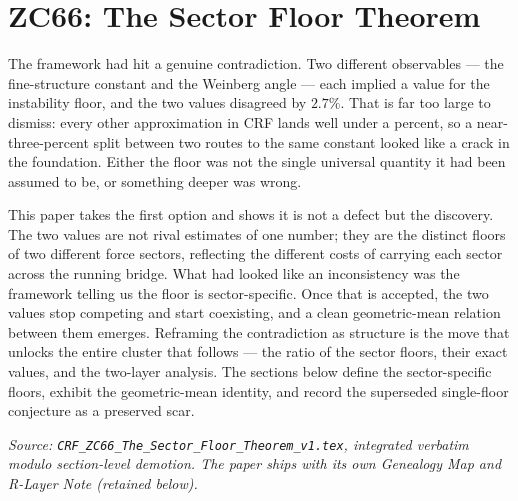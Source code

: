 \documentclass[12pt, a4paper]{article}
\begin{document}
\bigskip

\section{ZC66: The Sector Floor Theorem}

The framework had hit a genuine contradiction. Two different observables ---
the fine-structure constant and the Weinberg angle --- each implied a value for
the instability floor, and the two values disagreed by $2.7\%$. That is far too
large to dismiss: every other approximation in CRF lands well under a percent, so
a near-three-percent split between two routes to the same constant looked like a
crack in the foundation. Either the floor was not the single universal quantity
it had been assumed to be, or something deeper was wrong.

This paper takes the first option and shows it is not a defect but the
discovery. The two values are not rival estimates of one number; they are the
distinct floors of two different force sectors, reflecting the different costs
of carrying each sector across the running bridge. What had looked like an
inconsistency was the framework telling us the floor is sector-specific. Once
that is accepted, the two values stop competing and start coexisting, and a
clean geometric-mean relation between them emerges. Reframing the contradiction
as structure is the move that unlocks the entire cluster that follows --- the
ratio of the sector floors, their exact values, and the two-layer analysis. The
sections below define the sector-specific floors, exhibit the geometric-mean
identity, and record the superseded single-floor conjecture as a preserved scar.
\label{sec:zc66}

\noindent
\textit{Source: \texttt{CRF\_ZC66\_The\_Sector\_Floor\_Theorem\_v1.tex}, integrated verbatim modulo
section-level demotion. The paper ships with its own Genealogy Map
and R-Layer Note (retained below).}

\medskip

\sloppy

\end{document}
